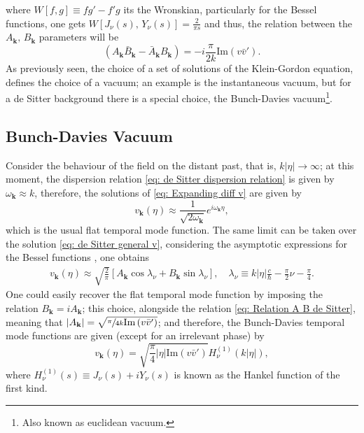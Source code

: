 where $W[f,g]\equiv fg'-f'g$ its the Wronskian, particularly \cite[\href{https://dlmf.nist.gov/10.5}{10.5.2}]{DLMF} for the Bessel functions, one gets $W\left[J_\nu\left(s\right),\,Y_\nu\left(s\right)\right]=\frac{2}{\pi s}$
and thus, the relation between the  $A_\mathbf{k},\,B_\mathbf{k}$ parameters will be
\begin{equation}\label{eq: Relation A B de Sitter}
	\left(A_\mathbf{k}\bar{B}_\mathbf{k}-\bar{A}_\mathbf{k}B_\mathbf{k}\right)=-i\frac{\pi}{2k}\text{Im}\left(v\bar{v}'\right).
\end{equation}
As previously seen, the choice of a set of solutions of the Klein-Gordon equation, defines the choice of a vacuum; an example is the instantaneous vacuum, but for a de Sitter background there is a special choice, the Bunch-Davies vacuum\footnote{Also known as euclidean vacuum.}.
\subsection{Bunch-Davies Vacuum}
Consider the behaviour of the field on the distant past, that is, $k|\eta|\to\infty$; at this moment, the dispersion relation \ref{eq: de Sitter dispersion relation} is given by $\omega_\mathbf{k}\approx k$, therefore, the solutions of \ref{eq: Expanding diff v} are given by
\begin{equation}
	v_\mathbf{k}(\eta)\approx \frac{1}{\sqrt{2\omega_\mathbf{k}}}e^{i\omega_\mathbf{k}\eta},
\end{equation}
which is the usual flat temporal mode function. The same limit can be taken over the solution \ref{eq: de Sitter general v}, 
considering the asymptotic expressions for the Bessel functions \cite[\href{https://dlmf.nist.gov/10.7}{10.7.8}]{DLMF}, one obtains
\begin{subequations}
	\begin{gather}
		v_\mathbf{k}(\eta)\approx \sqrt{\frac{2}{\pi}}\left[A_\mathbf{k}\cos\lambda_\nu+B_\mathbf{k}\sin\lambda_\nu\right],\quad \lambda_\nu\equiv k|\eta|\frac{c}{\hbar}-\frac{\pi}{2}\nu-\frac{\pi}{4}.\tag{\theequation \,\,a,b}
	\end{gather}
\end{subequations}
One could easily recover the flat temporal mode function by imposing the relation 
$B_\mathbf{k}=iA_\mathbf{k}$; this choice, alongside the relation \ref{eq: Relation A B de Sitter}, meaning that  $|A_\mathbf{k}|=\sqrt{\sfrac{\pi}{4 k}\text{Im}\left(v\bar{v}'\right)}$; and therefore, the Bunch-Davies temporal mode functions are given (except for an irrelevant phase) by
\begin{equation}
	v_\mathbf{k}(\eta)=\sqrt{\frac{\pi}{4 }|\eta|\text{Im}\left(v\bar{v}'\right)}H^{(1)}_\nu\left(k|\eta|\right),
\end{equation}
where $H^{(1)}_\nu(s)\equiv J_\nu(s)+iY_\nu(s)$ is known as the Hankel function of the first kind.

